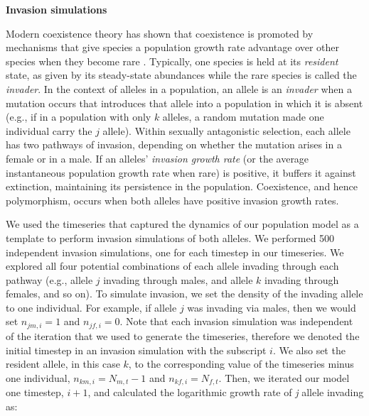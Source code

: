 \vspace{5mm}
\noindent\textbf{Invasion simulations}

 Modern coexistence theory has shown that coexistence is promoted by mechanisms that give species a population growth rate advantage over other species when they become rare \citep{chesson_stabilizing_1982, chesson2003quantifying, barabas_chessons_2018}. Typically, one species is held at its \textit{resident} state, as given by its steady-state abundances while the rare species is called the \textit{invader}. In the context of alleles in a population, an allele is an \textit{invader} when a mutation occurs that introduces that allele into a population in which it is absent (e.g., if in a population with only $k$ alleles, a random mutation made one individual carry the $j$ allele). Within sexually antagonistic selection, each allele has two pathways of invasion, depending on whether the mutation arises in a female or in a male. If an alleles' \textit{invasion growth rate} (or the average instantaneous population growth rate when rare) is positive, it buffers it against extinction, maintaining its persistence in the population.  Coexistence, and hence polymorphism, occurs when both alleles have positive invasion growth rates.

We used the timeseries that captured the dynamics of our population model as a template to perform invasion simulations of both alleles. We performed 500 independent invasion simulations, one for each timestep in our timeseries. We explored all four potential combinations of each allele invading through each pathway (e.g., allele $j$ invading through males, and allele $k$ invading through females, and so on). To simulate invasion, we set the density of the invading allele to one individual. For example, if allele $j$ was invading via males, then we would set $n_{jm,i} = 1$ and $n_{jf,i}= 0$. Note that each invasion simulation was independent of the iteration that we used to generate the timeseries, therefore we denoted the initial timestep in an invasion simulation with the subscript $i$. We also set the resident allele, in this case $k$, to the corresponding value of the timeseries minus one individual, $n_{km,i} = N_{m,t} -1$ and $n_{kf,i} = N_{f,t}$. Then, we iterated our model one timestep, $i+1$, and calculated the logarithmic growth rate of \textit{j} allele invading as:


